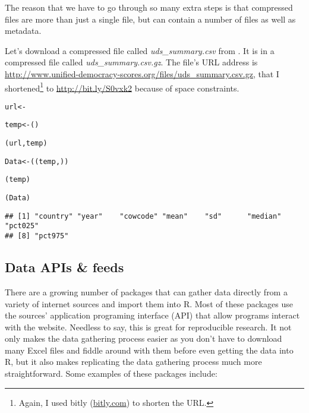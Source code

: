 \noindent The reason that we have to go through so many extra steps is that compressed files are more than just a single file, but can contain a number of files as well as metadata.

Let's download a compressed file called {\emph{uds\_summary.csv}} from \cite{Pemstein2010}. It is in a compressed file called {\emph{uds\_summary.csv.gz}}. The file's URL address is {\url{http://www.unified-democracy-scores.org/files/uds_summary.csv.gz}}, that I shortened\footnote{Again, I used bitly (\url{bitly.com}) to shorten the URL.} to \url{http://bit.ly/S0vxk2} because of space constraints.

{\footnotesize
\begin{knitrout}
\color{fgcolor}\begin{kframe}
\begin{alltt}
url <- 

temp <- ()

(url, temp)

Data <- ((temp, ))

(temp)

(Data)
\end{alltt}
\begin{verbatim}
## [1] "country" "year"    "cowcode" "mean"    "sd"      "median"  "pct025" 
## [8] "pct975"
\end{verbatim}
\end{kframe}
\end{knitrout}

}

\subsection{Data APIs \& feeds}

There are a growing number of packages that can gather data directly from a variety of internet sources and import them into R. Most of these packages use the sources' application programing interface (API) that allow programs interact with the website. Needless to say, this is great for reproducible research. It not only makes the data gathering process easier as you don't have to download many Excel files and fiddle around with them before even getting the data into R, but it also makes replicating the data gathering process much more straightforward. Some examples of these packages include: 

